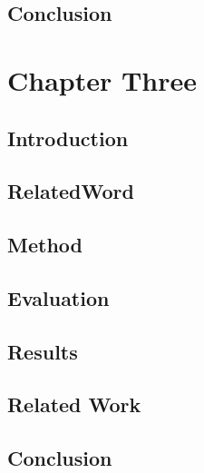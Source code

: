 \documentclass[letterpaper]{polythesis}
\begin{document}
\section{Conclusion}\label{sec:ChapTwoConclusion}


\chapter{Chapter Three}
\label{ch-3}

\section{Introduction}\label{sec:ChapThreeIntroduction}


\section{RelatedWord}\label{sec:ChapThreeMotivation}


\section{Method}\label{sec:ChapThreeMethod}


\section{Evaluation}\label{sec:ChapThreeEvaluation}


\section{Results}\label{sec:ChapThreeResults}


\section{Related Work}\label{sec:ChapThreeDiscussion} 


\section{Conclusion}\label{sec:ChapThreeConclusion}




{\singlespace

}
\end{document}
